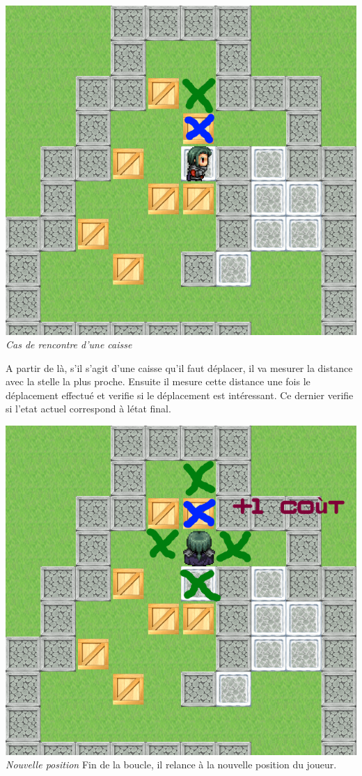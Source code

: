 \documentclass{article}
\begin{document}
\begin{center}
\includegraphics[scale=0.3]{img/a01.png} \newline
\textit{Cas de rencontre d'une caisse}
\end{center}
A partir de là, s'il s'agit d'une caisse qu'il faut déplacer, il va mesurer la distance avec la stelle la plus proche. Ensuite il mesure cette distance une fois le déplacement effectué et verifie si le déplacement est intéressant. 
Ce dernier verifie si l'etat actuel correspond à létat final.
\begin{center}
\includegraphics[scale=0.3]{img/a02.png} \newline
\textit{Nouvelle position}\newline
Fin de la boucle, il relance à la nouvelle position du joueur.
\end{center}
\vspace{1 cm}
\end{document}
